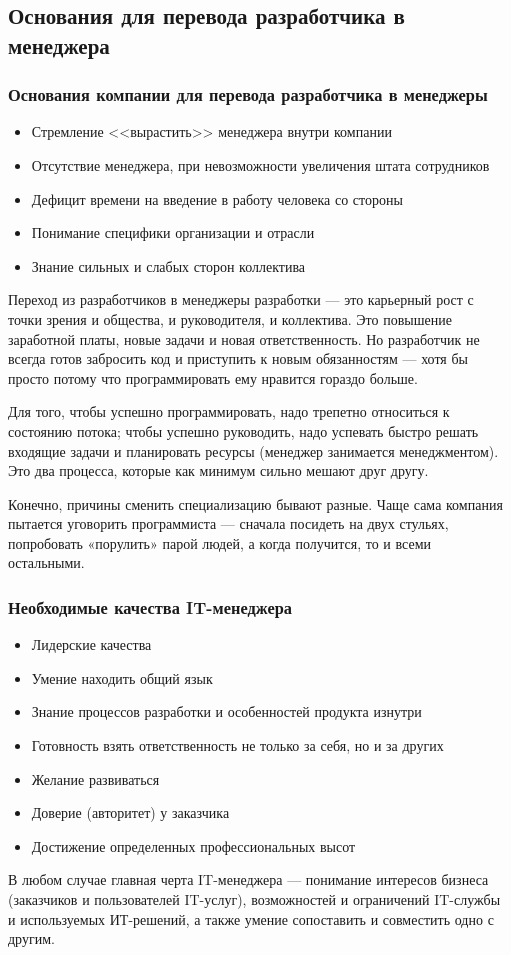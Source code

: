 \documentclass{../industrial-development}
\begin{document}
\subsection{Основания для перевода разработчика в менеджера}
\begin{frame} \frametitle{Основания компании для перевода разработчика в менеджеры}
\begin{itemize}
		\item Стремление <<вырастить>> менеджера внутри компании		
		\item Отсутствие менеджера, при невозможности увеличения штата сотрудников
		\item Дефицит времени на введение в работу человека со стороны	
		\item Понимание специфики организации и отрасли
		\item Знание сильных и слабых сторон коллектива
	\end{itemize}
\end{frame}
\lecturenotes
Переход из разработчиков в менеджеры разработки — это карьерный рост с точки зрения и общества, и руководителя, и коллектива. Это повышение заработной платы, новые задачи и новая ответственность. Но разработчик не всегда готов забросить код и приступить к новым обязанностям — хотя бы просто потому что программировать ему нравится гораздо больше. 

Для того, чтобы успешно программировать, надо трепетно относиться к состоянию потока; чтобы успешно руководить, надо успевать быстро решать входящие задачи и планировать ресурсы (менеджер занимается менеджментом). Это два процесса, которые как минимум сильно мешают друг другу.

Конечно, причины сменить специализацию бывают разные. Чаще сама компания пытается уговорить программиста — сначала посидеть на двух стульях, попробовать «порулить» парой людей, а когда получится, то и всеми остальными.

\begin{frame} \frametitle{Необходимые качества IT-менеджера}
\begin{itemize}
		\item Лидерские качества
		\item Умение находить общий язык
		\item Знание процессов разработки и особенностей продукта изнутри
		\item Готовность взять ответственность не только за себя, но и за других
		\item Желание развиваться
		\item Доверие (авторитет) у заказчика
		\item Достижение определенных профессиональных высот

	\end{itemize}
\end{frame}
\lecturenotes
В любом случае главная черта IT-менеджера — понимание интересов бизнеса (заказчиков и пользователей IT-услуг), возможностей и ограничений IT-службы и используемых ИТ-решений, а также умение сопоставить и совместить одно с другим.
\end{document}
